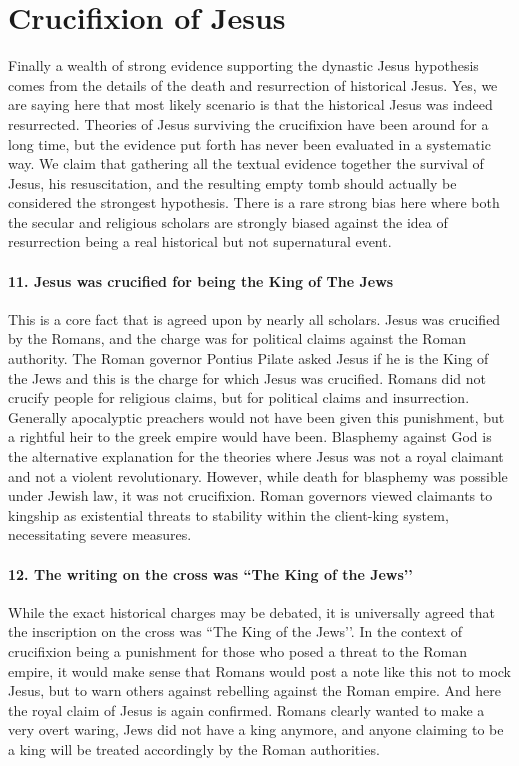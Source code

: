 \section{Crucifixion of Jesus}\label{sec:crucifixion-of-jesus}
Finally a wealth of strong evidence supporting the dynastic Jesus hypothesis comes from the details of the death and resurrection of historical Jesus.
Yes, we are saying here that most likely scenario is that the historical Jesus was indeed resurrected.
Theories of Jesus surviving the crucifixion have been around for a long time, but the evidence put forth has never been evaluated in a systematic way.
We claim that gathering all the textual evidence together the survival of Jesus, his resuscitation, and the resulting empty tomb should actually be considered the strongest hypothesis.
There is a rare strong bias here where both the secular and religious scholars are strongly biased against the idea of resurrection being a real historical but not supernatural event.

\paragraph{11.
Jesus was crucified for being the King of The Jews}\label{par:jesus-was-crucified-for-being-the-king-of-the-jews}
This is a core fact that is agreed upon by nearly all scholars.
Jesus was crucified by the Romans, and the charge was for political claims against the Roman authority.
The Roman governor Pontius Pilate asked Jesus if he is the King of the Jews and this is the charge for which Jesus was crucified.
Romans did not crucify people for religious claims, but for political claims and insurrection.
Generally apocalyptic preachers would not have been given this punishment, but a rightful heir to the greek empire would have been.
Blasphemy against God is the alternative explanation for the theories where Jesus was not a royal claimant and not a violent revolutionary.
However, while death for blasphemy was possible under Jewish law, it was not crucifixion.
Roman governors viewed claimants to kingship as existential threats to stability within the client-king system, necessitating severe measures.
\paragraph{12.
The writing on the cross was ``The King of the Jews’’}\label{par:the-writing-on-the-cross-was-the-king-of-the-jews}
While the exact historical charges may be debated, it is universally agreed that the inscription on the cross was ``The King of the Jews’’.
In the context of crucifixion being a punishment for those who posed a threat to the Roman empire, it would make sense that Romans would post a note like this not to mock Jesus, but to warn others against rebelling against the Roman empire.
And here the royal claim of Jesus is again confirmed.
Romans clearly wanted to make a very overt waring, Jews did not have a king anymore, and anyone claiming to be a king will be treated accordingly by the Roman authorities.
